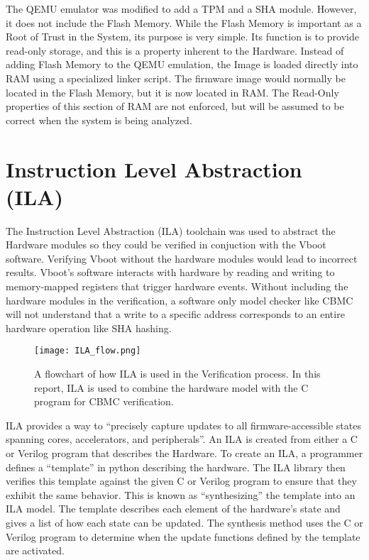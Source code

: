 The QEMU emulator was modified to add a TPM and a SHA module. 
However, it does not include the Flash Memory.
While the Flash Memory is important as a Root of Trust in the System, its purpose is very simple.
Its function is to provide read-only storage, and this is a property inherent to
the Hardware.
Instead of adding Flash Memory to the QEMU emulation, the Image is loaded
directly into RAM using a specialized linker script. %
The firmware image would normally be located in the Flash Memory, but it is now
located in RAM\@.
The Read-Only properties of this section of RAM are not enforced, but will be
assumed to be correct when the system is being analyzed.

\section{Instruction Level Abstraction (ILA)}

The Instruction Level Abstraction (ILA) toolchain was used to abstract the
Hardware modules so they could be verified in conjuction with the Vboot software.
Verifying Vboot without the hardware modules would lead to incorrect results. 
Vboot's software interacts with hardware by reading and
writing to memory-mapped registers that trigger hardware events.
Without including the hardware modules in the verification, a software only model 
checker like CBMC will not understand that a write to a specific address corresponds to
an entire hardware operation like SHA hashing.

\begin{figure}
  \centering
  \texttt{[image: ILA\_flow.png]}
  \caption[ILA Verification Flowchart]{A flowchart of how ILA is used in the Verification process.
  In this report, ILA is used to combine the hardware model with the C program for CBMC verification.}
  \label{fig:ILA_flow}
\end{figure}

ILA provides a way to ``precisely capture updates to all firmware-accessible
states spanning cores, accelerators, and peripherals''\cite{ila-template}.
An ILA is created from either a C or Verilog program that describes the
Hardware.
To create an ILA, a programmer defines a ``template'' in python describing the
hardware.
The ILA library then verifies this template against the given C or Verilog
program to ensure that they exhibit the same behavior.
This is known as ``synthesizing'' the template into an ILA model.
The template describes each element of the hardware's state and gives a list of
how each state can be updated.
The synthesis method uses the C or Verilog program to determine when the update
functions defined by the template are activated.


